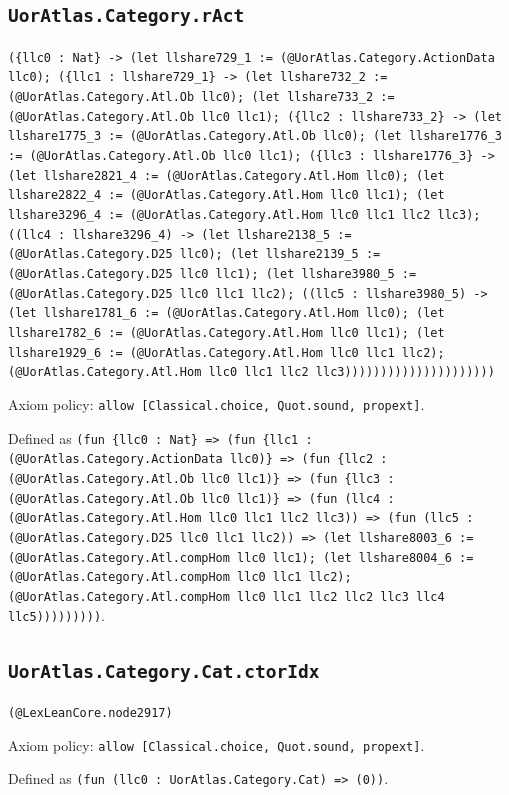 \documentclass[11pt]{article}
\begin{document}
\subsection*{\texttt{UorAtlas.Category.rAct}}
\noindent\texttt{(\{llc0 : Nat\} -> (let llshare729\_1 := (@UorAtlas.Category.ActionData llc0); (\{llc1 : llshare729\_1\} -> (let llshare732\_2 := (@UorAtlas.Category.Atl.Ob llc0); (let llshare733\_2 := (@UorAtlas.Category.Atl.Ob llc0 llc1); (\{llc2 : llshare733\_2\} -> (let llshare1775\_3 := (@UorAtlas.Category.Atl.Ob llc0); (let llshare1776\_3 := (@UorAtlas.Category.Atl.Ob llc0 llc1); (\{llc3 : llshare1776\_3\} -> (let llshare2821\_4 := (@UorAtlas.Category.Atl.Hom llc0); (let llshare2822\_4 := (@UorAtlas.Category.Atl.Hom llc0 llc1); (let llshare3296\_4 := (@UorAtlas.Category.Atl.Hom llc0 llc1 llc2 llc3); ((llc4 : llshare3296\_4) -> (let llshare2138\_5 := (@UorAtlas.Category.D25 llc0); (let llshare2139\_5 := (@UorAtlas.Category.D25 llc0 llc1); (let llshare3980\_5 := (@UorAtlas.Category.D25 llc0 llc1 llc2); ((llc5 : llshare3980\_5) -> (let llshare1781\_6 := (@UorAtlas.Category.Atl.Hom llc0); (let llshare1782\_6 := (@UorAtlas.Category.Atl.Hom llc0 llc1); (let llshare1929\_6 := (@UorAtlas.Category.Atl.Hom llc0 llc1 llc2); (@UorAtlas.Category.Atl.Hom llc0 llc1 llc2 llc3)))))))))))))))))))))}\par
\noindent Axiom policy: \texttt{allow [Classical.choice, Quot.sound, propext]}.\par
\noindent Defined as \texttt{(fun \{llc0 : Nat\} => (fun \{llc1 : (@UorAtlas.Category.ActionData llc0)\} => (fun \{llc2 : (@UorAtlas.Category.Atl.Ob llc0 llc1)\} => (fun \{llc3 : (@UorAtlas.Category.Atl.Ob llc0 llc1)\} => (fun (llc4 : (@UorAtlas.Category.Atl.Hom llc0 llc1 llc2 llc3)) => (fun (llc5 : (@UorAtlas.Category.D25 llc0 llc1 llc2)) => (let llshare8003\_6 := (@UorAtlas.Category.Atl.compHom llc0 llc1); (let llshare8004\_6 := (@UorAtlas.Category.Atl.compHom llc0 llc1 llc2); (@UorAtlas.Category.Atl.compHom llc0 llc1 llc2 llc2 llc3 llc4 llc5)))))))))}.\par
\subsection*{\texttt{UorAtlas.Category.Cat.ctorIdx}}
\noindent\texttt{(@LexLeanCore.node2917)}\par
\noindent Axiom policy: \texttt{allow [Classical.choice, Quot.sound, propext]}.\par
\noindent Defined as \texttt{(fun (llc0 : UorAtlas.Category.Cat) => (0))}.\par
\end{document}
